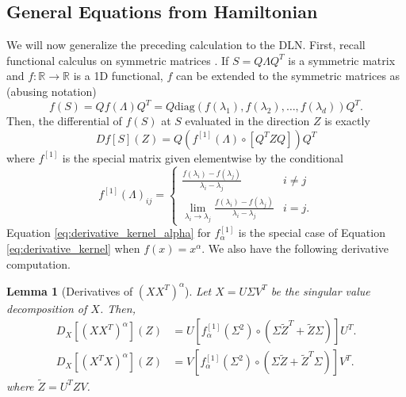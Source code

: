 \documentclass{amsart}
\newtheorem{lemma}[theorem]{Lemma}
\theoremstyle{definition}
\theoremstyle{remark}
\numberwithin{equation}{section}
\begin{document}
\subsection{General Equations from Hamiltonian}\label{sec:dln_general_case_proof}
We will now generalize the preceding calculation to the DLN. First, recall functional calculus on symmetric matrices \cite[Chapter 2]{bhatia2009positive}. If $S = Q\Lambda Q^T$ is a symmetric matrix and $f : \mathbb{R} \to \mathbb{R}$ is a 1D functional, $f$ can be extended to the symmetric matrices as (abusing notation)
    \begin{equation}
    f(S) = Qf(\Lambda)Q^T = Q\text{diag}(f(\lambda_1), f(\lambda_2), \dots, f(\lambda_d))Q^T.
    \end{equation}
    Then, the differential of $f(S)$ at $S$ evaluated in the direction $Z$ is exactly
    \begin{equation}
        Df[S](Z) = Q\left(f^{[1]}(\Lambda) \circ \left[Q^T Z Q\right]\right) Q^T
    \end{equation}
    where $f^{[1]}$ is the special matrix given elementwise by the conditional
    \begin{equation}\label{eq:derivative_kernel}
        f^{[1]}(\Lambda)_{ij} = \begin{cases}
            \frac{f(\lambda_i) - f(\lambda_j)}{\lambda_i - \lambda_j} & i \neq j \\
            \lim_{\lambda_i \to \lambda_j}\frac{f(\lambda_i) - f(\lambda_j)}{\lambda_i - \lambda_j} & i = j.
        \end{cases}
    \end{equation}
Equation \ref{eq:derivative_kernel_alpha} for $f^{[1]}_\alpha$ is the special case of Equation \ref{eq:derivative_kernel} when $f(x) = x^\alpha$. We also have the following derivative computation.
\begin{lemma}[Derivatives of $(XX^T)^\alpha$]\label{lem:deriv_of_alpha}
Let $X = U\Sigma V^T$ be the singular value decomposition of $X$. Then,
    \begin{align}
D_X\left[\left(XX^T\right)^{\alpha}\right](Z) &= U\left[f_{\alpha}^{[1]}\left(\Sigma^2\right) \circ \left(\Sigma \tilde{Z}^T + \tilde{Z}\Sigma\right)\right] U^T.\\        D_X\left[\left(X^TX\right)^{\alpha}\right](Z) &= V\left[f_{\alpha}^{[1]}\left(\Sigma^2\right) \circ \left(\Sigma \tilde{Z} + \tilde{Z}^T \Sigma\right)\right] V^T.
    \end{align}
    where $\tilde{Z} = U^TZV$.
\end{lemma}
\end{document}
